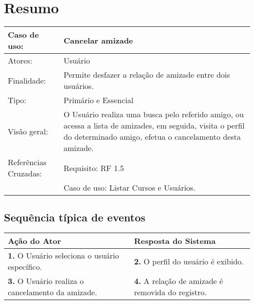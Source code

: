 \documentclass[12pt,a4paper,onecolumn,titlepage]{article}
\begin{document}
\newpage

\section{Resumo}
\begin{table}[h!]
\begin{center}
\begin{tabular}{p{2.5cm} p{9.5cm}}
Caso de uso: & \textbf{Cancelar amizade} \\ \hline
Atores: & Usuário \\ \hline
Finalidade: & Permite desfazer a relação de amizade entre dois usuários. \\ \hline
Tipo: & Primário e Essencial\\ \hline
Visão geral: & O Usuário realiza uma busca pelo referido amigo, ou acessa a lista de amizades, em seguida, visita o perfil do determinado amigo, efetua o cancelamento desta amizade. \\ \hline
Referências Cruzadas: & Requisito: RF 1.5 \\ & Caso de uso: Listar Cursos e Usuários.

\end{tabular}
\end{center}
\end{table}

\subsection{Sequência típica de eventos}
\begin{center}
\def\arraystretch{1.1}
\begin{tabular}{|p{6cm}|p{6cm}|}

\hline
\textbf{Ação do Ator} & \textbf{Resposta do Sistema} \\ \hline
\textbf{1.} O Usuário seleciona o usuário específico. & \textbf{2.} O perfil do usuário é exibido. \\ \hline
\textbf{3.} O Usuário realiza o cancelamento da amizade. & \textbf{4.} A relação de amizade é removida do registro.\\ \hline
\end{tabular}
\end{center}

\newpage



\end{document}
